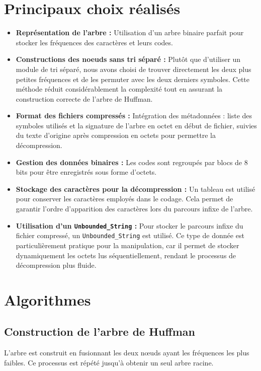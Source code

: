 \documentclass[12pt,a4paper]{article}
\begin{document}
\section{Principaux choix réalisés}
\begin{itemize}
    \item \textbf{Représentation de l'arbre :} Utilisation d'un arbre binaire parfait pour stocker les fréquences des caractères et leurs codes.
    \item \textbf{Constructions des noeuds sans tri séparé :} Plutôt que d'utiliser un module de tri séparé, nous avons choisi de trouver directement les deux plus petites fréquences et de les permuter avec les deux derniers symboles. Cette méthode réduit considérablement la complexité tout en assurant la construction correcte de l'arbre de Huffman.
    
    \item \textbf{Format des fichiers compressés :} Intégration des métadonnées : liste des symboles utilisés et la signature de l'arbre en octet en début de fichier, suivies du texte d'origine après compression en octets pour permettre la décompression.
    
    \item \textbf{Gestion des données binaires :} Les codes sont regroupés par blocs de 8 bits pour être enregistrés sous forme d'octets.
    \item \textbf{Stockage des caractères pour la décompression :} Un tableau est utilisé pour conserver les caractères employés dans le codage. Cela permet de garantir l'ordre d'apparition des caractères lors du parcours infixe de l'arbre.
    \item \textbf{Utilisation d'un \texttt{Unbounded\_String} :} Pour stocker le parcours infixe du fichier compressé, un \texttt{Unbounded\_String} est utilisé. Ce type de donnée est particulièrement pratique pour la manipulation, car il permet de stocker dynamiquement les octets lus séquentiellement, rendant le processus de décompression plus fluide.
\end{itemize}

\section{Algorithmes}

\subsection{Construction de l'arbre de Huffman}
L'arbre est construit en fusionnant les deux nœuds ayant les fréquences les plus faibles. Ce processus est répété jusqu'à obtenir un seul arbre racine.
\end{document}

